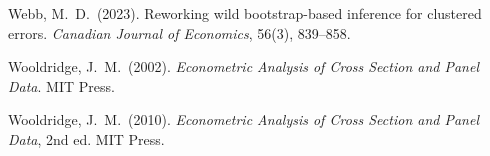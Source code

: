 \documentclass[12pt, a4paper]{article}
\theoremstyle{definition}
\begin{document}
\begin{enumerate}[label={[\arabic*]}, leftmargin=*, itemsep=4pt]
\item Webb, M.~D.\ (2023). Reworking wild bootstrap-based inference for clustered errors. \textit{Canadian Journal of Economics}, 56(3), 839--858.

\item Wooldridge, J.~M.\ (2002). \textit{Econometric Analysis of Cross Section and Panel Data}. MIT Press.

\item Wooldridge, J.~M.\ (2010). \textit{Econometric Analysis of Cross Section and Panel Data}, 2nd ed. MIT Press.

\end{enumerate}
\end{document}
